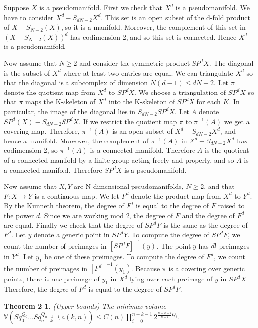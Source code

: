 \documentclass{amsart}
\newtheorem*{Theorem 1}{Theorem 1}
\newtheorem*{Theorem 2}{Theorem 2}
\newtheorem*{Theorem 1A}{Theorem 1A}
\newtheorem*{Theorem 2A}{Theorem 2A}
\newtheorem*{vanishing lemma}{Vanishing Lemma}
\numberwithin{equation}{section}
\begin{document}
\proof Suppose $X$ is a pseudomanifold.  First we check that
$X^d$ is a pseudomanifold.  We have to consider $X^d - S_{dN - 2} X^d$.  This
set is an open subset of the d-fold product of $X - S_{N-2}(X)$, so it
is a manifold.  Moreover, the complement of this set in $(X - S_{N-2}(X))^d$
has codimension 2, and so this set is connected.  Hence $X^d$ is a pseudomanifold.

Now assume that $N \ge 2$ and consider the symmetric product $SP^d X$.  The
diagonal is the subset of $X^d$ where at least two entries are equal.  We can
triangulate $X^d$ so that the diagonal is a
subcomplex of dimension $N(d-1) \le dN - 2$.  Let $\pi$ denote the quotient
map from $X^d$ to $SP^d X$.  We choose a triangulation of $SP^d X$ so that 
$\pi$ maps the K-skeleton of $X^d$ into the K-skeleton of $SP^d X$ for each $K$.
In particular, the image of the diagonal lies in $S_{dN-2} SP^d X$.  
Let $A$ denote $SP^d(X) - S_{dN-2} SP^d X$.  If we restrict the quotient map 
$\pi$ to $\pi^{-1}(A)$ we get a covering map.  Therefore, $\pi^{-1}(A)$ is
an open subset of $X^d - S_{dN-2} X^d$, and hence a manifold.  Moreover,
the complement of $\pi^{-1}(A)$ in $X^d - S_{dN-2} X^d$ has codimension 2, so
$\pi^{-1}(A)$ is a connected manifold.
Therefore $A$ is the quotient of a connected manifold by a finite group acting
freely and properly, and so $A$ is a connected manifold.  Therefore
$SP^d X$ is a pseudomanifold.

Now assume that $X, Y$ are N-dimensional pseudomanifolds, $N \ge 2$, and that $F: X
\rightarrow Y$ is a continuous map.  We let $F^d$ denote the product map
from $X^d$ to $Y^d$.  By the Kunneth theorem, the degree of $F^d$ is equal
to the degree of $F$ raised to the power $d$.  Since we are working mod 2, the degree
of $F$ and the degree of $F^d$
are equal.  Finally we check that the degree of $SP^d F$ is the same as
the degree of $F^d$.  Let $y$ denote a generic point in $SP^d Y$.  To compute
the degree of $SP^d F$, we count the number of preimages in $[SP^d F]^{-1}(y)$.
The point $y$ has $d!$ preimages in $Y^d$.  Let $y_1$ be one of these preimages.
To compute the degree of $F^d$, we count the number of preimages in
$[F^d]^{-1}(y_1)$.  Because $\pi$ is a covering over generic points, there is
one preimage of $y_1$ in $X^d$ lying over each preimage of $y$ in $SP^d X$.
Therefore, the degree of $F^d$ is equal to the degree of $SP^d F$. \endproof

\begin{Theorem 2} (Upper bounds) The minimax volume $\mathbb{V}(Sq_0^{Q_0} ...
Sq_{n-k-1}^{Q_{n-k-1}} a(k,n)) \le C(n) \prod_{i=0}^{n-k-1}
2^{\frac{n-k-i}{n-i} Q_i}$.
\end{Theorem 2}
\end{document}
